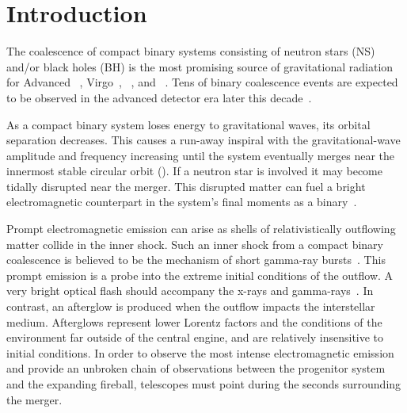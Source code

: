 \section{Introduction}
\label{sec:introduction}


 The coalescence of compact binary systems consisting of neutron stars (NS)
and/or black holes (BH) is the most promising source of gravitational radiation
for Advanced \LIGO~\cite{ALIGOWeb}, Virgo~\cite{AVirgoWeb}, \GEO~\cite{GEOWeb}, and
\LCGT~\cite{LCGTWeb}.  Tens of
binary coalescence events are expected to be observed in the
advanced detector era later this decade~\cite{Abadie:2010p10836}.

As a compact binary system loses energy to gravitational waves, its orbital separation
decreases. This causes a run-away inspiral with the gravitational-wave
amplitude and frequency increasing until the system eventually merges near the
innermost stable circular orbit (\ISCO).  If a neutron star is involved it may become tidally disrupted near the merger.
This disrupted matter can fuel a bright electromagnetic
counterpart in the system's final moments as a binary~\cite{shibata:2007}.

Prompt electromagnetic emission can arise as shells of relativistically
outflowing matter collide in the inner shock. Such an inner shock from a
compact binary coalescence is believed to be the mechanism of short gamma-ray
bursts~\cite{nakar07}. This prompt emission is a probe into the extreme initial
conditions of the outflow. A very bright optical flash should accompany the
x-rays and gamma-rays~\cite{Sari99}.  In contrast, an
afterglow is produced when the outflow impacts the interstellar medium.
Afterglows represent lower Lorentz factors and the conditions of the
environment far outside of the central engine, and are relatively insensitive
to initial conditions. In order to observe the most intense electromagnetic
emission and provide an unbroken chain of observations between the progenitor
system and the expanding fireball, telescopes must point during the seconds
surrounding the merger.

